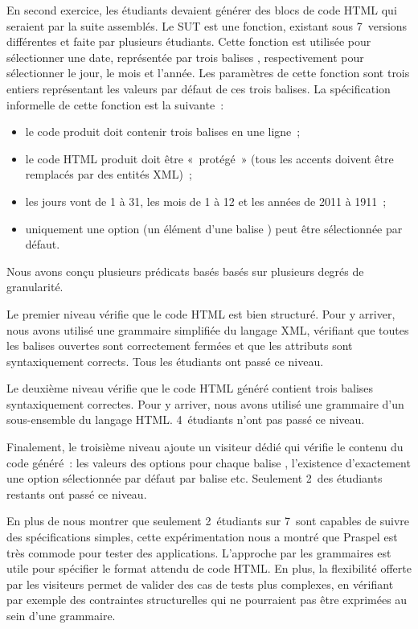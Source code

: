 En second exercice, les étudiants devaient générer des blocs de code HTML qui
seraient par la suite assemblés. Le SUT est une fonction, existant sous
7~versions différentes et faite par plusieurs étudiants. Cette fonction est
utilisée pour sélectionner une date, représentée par trois balises
, respectivement pour sélectionner le jour, le mois et l'année. Les
paramètres de cette fonction sont trois entiers représentant les valeurs par
défaut de ces trois balises. La spécification informelle de cette fonction est
la suivante~:
%
\begin{itemize}

\item le code produit doit contenir trois balises  en une ligne~;

\item le code HTML produit doit être «~protégé~» (tous les accents doivent être
remplacés par des entités XML)~;

\item les jours vont de 1 à 31, les mois de 1 à 12 et les années de 2011 à
1911~;

\item uniquement une option (un élément d'une balise ) peut être
sélectionnée par défaut.

\end{itemize}
%
Nous avons conçu plusieurs prédicats basés basés sur plusieurs degrés de
granularité.

Le premier niveau vérifie que le code HTML est bien structuré. Pour y arriver,
nous avons utilisé une grammaire simplifiée du langage XML, vérifiant que toutes
les balises ouvertes sont correctement fermées et que les attributs sont
syntaxiquement corrects. Tous les étudiants ont passé ce niveau.

Le deuxième niveau vérifie que le code HTML généré contient trois balises
 syntaxiquement correctes. Pour y arriver, nous avons utilisé une
grammaire d'un sous-ensemble du langage HTML. 4~étudiants n'ont pas passé ce
niveau.

Finalement, le troisième niveau ajoute un visiteur dédié qui vérifie le contenu
du code généré~: les valeurs des options pour chaque balise ,
l'existence d'exactement une option sélectionnée par défaut par balise etc.
Seulement 2~des étudiants restants ont passé ce niveau.

En plus de nous montrer que seulement 2~étudiants sur 7~sont capables de suivre
des spécifications simples, cette expérimentation nous a montré que Praspel est
très commode pour tester des applications. L'approche par les grammaires est
utile pour spécifier le format attendu de code HTML. En plus, la flexibilité
offerte par les visiteurs permet de valider des cas de tests plus complexes, en
vérifiant par exemple des contraintes structurelles qui ne pourraient pas être
exprimées au sein d'une grammaire.
